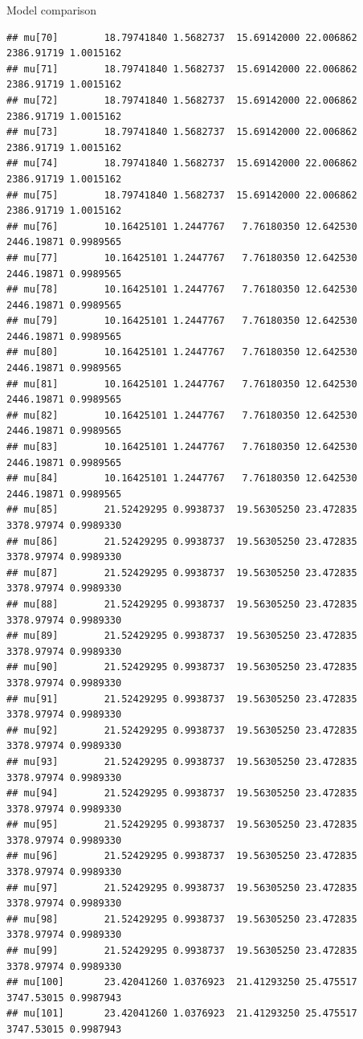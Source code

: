\documentclass[
  ignorenonframetext,
]{beamer}
\begin{document}
\begin{frame}[fragile]{Model comparison}
\begin{verbatim}
## mu[70]        18.79741840 1.5682737  15.69142000 22.006862 2386.91719 1.0015162
## mu[71]        18.79741840 1.5682737  15.69142000 22.006862 2386.91719 1.0015162
## mu[72]        18.79741840 1.5682737  15.69142000 22.006862 2386.91719 1.0015162
## mu[73]        18.79741840 1.5682737  15.69142000 22.006862 2386.91719 1.0015162
## mu[74]        18.79741840 1.5682737  15.69142000 22.006862 2386.91719 1.0015162
## mu[75]        18.79741840 1.5682737  15.69142000 22.006862 2386.91719 1.0015162
## mu[76]        10.16425101 1.2447767   7.76180350 12.642530 2446.19871 0.9989565
## mu[77]        10.16425101 1.2447767   7.76180350 12.642530 2446.19871 0.9989565
## mu[78]        10.16425101 1.2447767   7.76180350 12.642530 2446.19871 0.9989565
## mu[79]        10.16425101 1.2447767   7.76180350 12.642530 2446.19871 0.9989565
## mu[80]        10.16425101 1.2447767   7.76180350 12.642530 2446.19871 0.9989565
## mu[81]        10.16425101 1.2447767   7.76180350 12.642530 2446.19871 0.9989565
## mu[82]        10.16425101 1.2447767   7.76180350 12.642530 2446.19871 0.9989565
## mu[83]        10.16425101 1.2447767   7.76180350 12.642530 2446.19871 0.9989565
## mu[84]        10.16425101 1.2447767   7.76180350 12.642530 2446.19871 0.9989565
## mu[85]        21.52429295 0.9938737  19.56305250 23.472835 3378.97974 0.9989330
## mu[86]        21.52429295 0.9938737  19.56305250 23.472835 3378.97974 0.9989330
## mu[87]        21.52429295 0.9938737  19.56305250 23.472835 3378.97974 0.9989330
## mu[88]        21.52429295 0.9938737  19.56305250 23.472835 3378.97974 0.9989330
## mu[89]        21.52429295 0.9938737  19.56305250 23.472835 3378.97974 0.9989330
## mu[90]        21.52429295 0.9938737  19.56305250 23.472835 3378.97974 0.9989330
## mu[91]        21.52429295 0.9938737  19.56305250 23.472835 3378.97974 0.9989330
## mu[92]        21.52429295 0.9938737  19.56305250 23.472835 3378.97974 0.9989330
## mu[93]        21.52429295 0.9938737  19.56305250 23.472835 3378.97974 0.9989330
## mu[94]        21.52429295 0.9938737  19.56305250 23.472835 3378.97974 0.9989330
## mu[95]        21.52429295 0.9938737  19.56305250 23.472835 3378.97974 0.9989330
## mu[96]        21.52429295 0.9938737  19.56305250 23.472835 3378.97974 0.9989330
## mu[97]        21.52429295 0.9938737  19.56305250 23.472835 3378.97974 0.9989330
## mu[98]        21.52429295 0.9938737  19.56305250 23.472835 3378.97974 0.9989330
## mu[99]        21.52429295 0.9938737  19.56305250 23.472835 3378.97974 0.9989330
## mu[100]       23.42041260 1.0376923  21.41293250 25.475517 3747.53015 0.9987943
## mu[101]       23.42041260 1.0376923  21.41293250 25.475517 3747.53015 0.9987943

\end{verbatim}
\end{frame}
\end{document}
